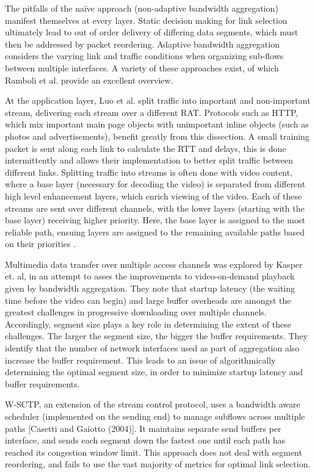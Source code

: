 \documentclass[12pt]{article}
\begin{document}
	The pitfalls of the na\"{i}ve approach (non-adaptive bandwidth aggregation) manifest themselves at every layer. Static decision making for link selection ultimately lead to out of order delivery of differing data segments, which must then be addressed by packet reordering. Adaptive bandwidth aggregation considers the varying link and traffic conditions when organizing sub-flows between multiple interfaces. A variety of these approaches exist, of which Ramboli et al. provide an excellent overview. 

	At the application layer, Luo et al. \cite{1204756} split traffic into important and non-important stream, delivering each stream over a different RAT. Protocols such as HTTP, which mix important main page objects with unimportant inline objects (such as photos and advertisements), benefit greatly from this dissection. A small training packet is sent along each link to calculate the RTT and delays, this is done intermittently and allows their implementation to better split traffic between different links. Splitting traffic into streams is often done with video content, where a base layer (necessary for decoding the video) is separated from different high level enhancement layers, which enrich viewing of the video. Each of these streams are sent over different channels, with the lower layers (starting with the base layer) receiving higher priority. Here, the base layer is assigned to the most reliable path, ensuing layers are assigned to the remaining available paths based on their priorities \cite{1363842}.

	Multimedia data transfer over multiple access channels was explored by Kasper et. al, in an attempt to asses the improvements to video-on-demand playback given by bandwidth aggregation. They note that startup latency (the waiting time before the video can begin) and large buffer overheads are amongst the greatest challenges in progressive downloading over multiple channels. Accordingly, segment size plays a key role in determining the extent of these challenges. The larger the segment size, the bigger the buffer requirements. They identify that the number of network interfaces used as part of aggregation also increase the buffer requirement. This leads to an issue of algorithmically determining the optimal segment size, in order to minimize startup latency and buffer requirements\cite{5421846}.

	W-SCTP, an extension of the stream control protocol, uses a bandwidth aware scheduler (implemented on the sending end) to manage subflows across multiple paths [Casetti and Gaiotto (2004)]. It maintains separate send buffers per interface, and sends each segment down the fastest one until each path has reached its congestion window limit. This approach does not deal with segment reordering, and fails to use the vast majority of metrics for optimal link selection. 
\end{document}
